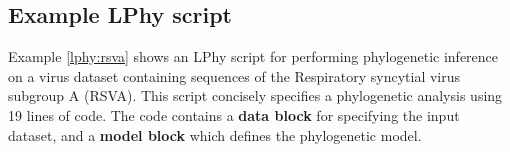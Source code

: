 \documentclass[10pt,letterpaper,table]{article}
\begin{document}

\subsection{Example LPhy script}

Example \ref{lphy:rsva} shows an LPhy script for performing phylogenetic inference on a virus dataset containing sequences of the Respiratory syncytial virus subgroup A (RSVA). 
This script concisely specifies a phylogenetic analysis using 19 lines of code.  
The code contains a \textbf{data block} for specifying the input dataset, and a \textbf{model block} which defines the phylogenetic model. 
\end{document}
